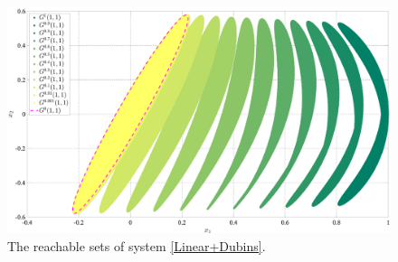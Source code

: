 \documentclass[../main.tex]{subfiles}
\begin{document}
\begin{figure}[ht]
	\centerline{
		\includegraphics[width=\textwidth]{images/Osipov_QuaziDubins.eps}}
	\caption{The reachable sets of system \eqref{Linear+Dubins}.}
	\label{fig:LinearDubins}
\end{figure}
\end{document}
